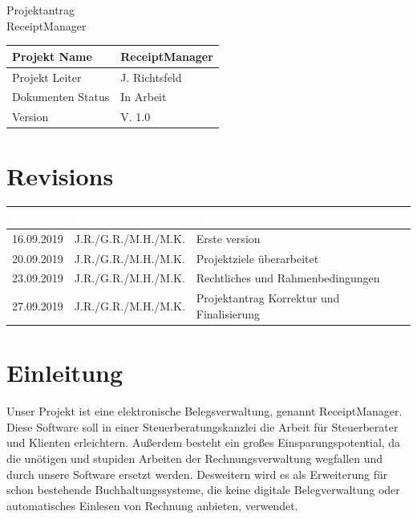 \documentclass[12pt]{article}
\theoremstyle{definition}
\newcommand{\projectname}{ReceiptManager}
\newcommand{\productname}{ReceiptManager}
\newcommand{\projectleader}{J. Richtsfeld}
\newcommand{\documentstatus}{In Arbeit}
\newcommand{\version}{V. 1.0}
\begin{document}
\begin{titlepage}
\begin{flushright}
\end{flushright}



\vspace{10em}

\begin{center}
{\Huge Projektantrag} \\[3em]
{\LARGE \productname} \\[3em]
\end{center}

\begin{flushleft}
\begin{tabular}{|l|l|}
\hline
Projekt Name & \projectname \\ \hline
Projekt Leiter & \projectleader \\ \hline
Dokumenten Status & \documentstatus \\ \hline
Version & \version \\ \hline
\end{tabular}
\end{flushleft}

\end{titlepage}
\section*{Revisions}
\begin{tabular}{|l|l|l|}
\hline
\cellcolor[gray]{0.5}\textcolor{white}{Date} & \cellcolor[gray]{0.5}\textcolor{white}{Author} & \cellcolor[gray]{0.5}\textcolor{white}{Change} \\ \hline
16.09.2019&J.R./G.R./M.H./M.K.&Erste version \\ \hline
20.09.2019&J.R./G.R./M.H./M.K.&Projektziele überarbeitet \\ \hline
23.09.2019&J.R./G.R./M.H./M.K.&Rechtliches und Rahmenbedingungen \\ \hline
27.09.2019&J.R./G.R./M.H./M.K.&Projektantrag Korrektur und Finalisierung \\ \hline
\end{tabular}
\pagebreak
\tableofcontents
\pagebreak

\section{Einleitung}

Unser Projekt ist eine elektronische Belegsverwaltung, genannt ReceiptManager. Diese Software soll in einer Steuerberatungskanzlei die Arbeit für Steuerberater und Klienten erleichtern. Außerdem besteht ein großes Einsparungspotential, da die unötigen und stupiden Arbeiten der Rechnungsverwaltung wegfallen und durch unsere Software ersetzt werden. Desweitern wird es als Erweiterung für schon bestehende Buchhaltungssysteme, die keine digitale Belegverwaltung oder automatisches Einlesen von Rechnung anbieten, verwendet.
\pagebreak
\end{document}
